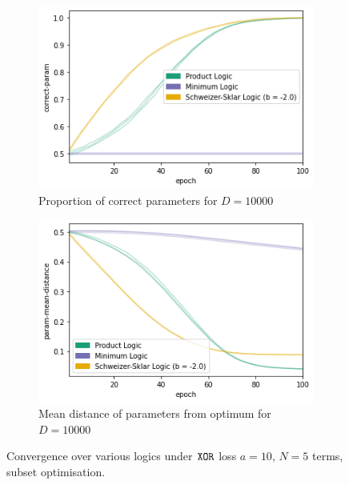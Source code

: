 \begin{figure}[h]
\begin{subfigure}[t]{0.45\textwidth}
        \includegraphics[width=\textwidth]{imgs/conj-cp-10000dim-keep50-5t.png}
        \caption{Proportion of correct parameters for $D=10000$}
        \label{fig:conjconvcpd10000}
    \end{subfigure}
    \begin{subfigure}[t]{0.45\textwidth}
        \centering
        \includegraphics[width=\textwidth]{imgs/conj-pmd-10000dim-keep50-5t.png}
        \caption{Mean distance of parameters from optimum for ${D=10000}$}
        \label{fig:conjconvpmdd10000}
    \end{subfigure}
       \caption{Convergence over various logics under $\texttt{XOR}$ loss $a=10$, $N=5$ terms, subset optimisation.}
       \label{fig:conjconvlogics}
\end{figure}

